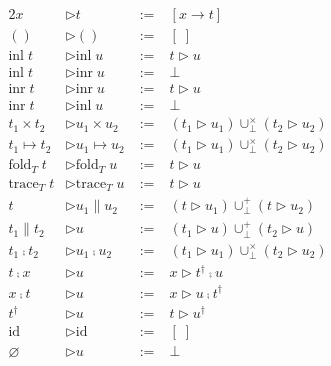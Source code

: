 \documentclass[a4j, dvipdfmx]{jsarticle}
\theoremstyle{definition}
\begin{document}
\begin{figure}[H]
  \begin{minipage}[b]{0.48\hsize}
    \begin{alignat*}{2}
      x                 &\triangleright t                 \;&:=\; &[x \rightarrow t] \\
      ()                &\triangleright ()                \;&:=\; &[\;] \\
      \text{inl}\;t     &\triangleright \text{inl}\;u     \;&:=\; &t \triangleright u \\
      \text{inl}\;t     &\triangleright \text{inr}\;u     \;&:=\; &\bot \\
      \text{inr}\;t     &\triangleright \text{inr}\;u     \;&:=\; &t \triangleright u \\
      \text{inr}\;t     &\triangleright \text{inl}\;u     \;&:=\; &\bot \\
      t_1\times{}t_2    &\triangleright u_1\times{}u_2    \;&:=\; &(t_1 \triangleright u_1)\cup^\times_\bot(t_2 \triangleright u_2) \\
      t_1\mapsto{}t_2   &\triangleright u_1\mapsto{}u_2   \;&:=\; &(t_1 \triangleright u_1)\cup^\times_\bot(t_2 \triangleright u_2) \\
      \text{fold}_T\;t  &\triangleright \text{fold}_T\;u  \;&:=\; &t \triangleright u \\
      \text{trace}_T\;t &\triangleright \text{trace}_T\;u \;&:=\; &t \triangleright u \\
      t                 &\triangleright u_1\parallel{}u_2 \;&:=\; &(t \triangleright u_1)\cup^+_\bot(t \triangleright u_2) \\
      t_1\parallel{}t_2 &\triangleright u                 \;&:=\; &(t_1 \triangleright u)\cup^+_\bot(t_2 \triangleright u) \\
      t_1\fcmp{}t_2     &\triangleright u_1\fcmp{}u_2     \;&:=\; &(t_1 \triangleright u_1)\cup^\times_\bot(t_2 \triangleright u_2) \\
      t\fcmp{}x         &\triangleright u                 \;&:=\; &x \triangleright t^\dagger\fcmp{}u \\
      x\fcmp{}t         &\triangleright u                 \;&:=\; &x \triangleright u\fcmp{}t^\dagger \\
      t^\dagger         &\triangleright u                 \;&:=\; &t \triangleright u^\dagger \\
      \text{id}         &\triangleright \text{id}         \;&:=\; &[\;] \\
      \varnothing       &\triangleright u                 \;&:=\; &\bot \\

\end{alignat*}
\end{minipage}
\end{figure}
\end{document}
